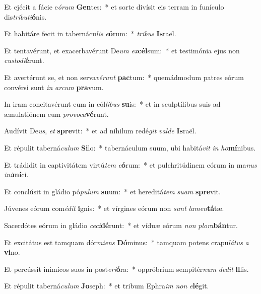 \item Et ejécit a fácie e\textit{ó}\textit{rum} \textbf{Gen}tes:~* et sorte divísit eis terram in funículo dis\textit{tri}\textit{bu}\textit{ti}\textbf{ó}nis.
\item Et habitáre fecit in tabernácu\textit{lis} \textit{e}\textbf{ó}rum:~* \textit{tri}\textit{bus} \textbf{Is}raël.
\item Et tentavérunt, et exacerbavérunt De\textit{um} \textit{ex}\textbf{cél}sum:~* et testimónia ejus non \textit{cus}\textit{to}\textit{di}\textbf{é}runt.
\item Et avertérunt se, et non serva\textit{vé}\textit{runt} \textbf{pac}tum:~* quemádmodum patres eórum convérsi sunt \textit{in} \textit{ar}\textit{cum} \textbf{pra}vum.
\item In iram concitavérunt eum in cól\textit{li}\textit{bus} \textbf{su}is:~* et in sculptílibus suis ad æmulatiónem eum \textit{pro}\textit{vo}\textit{ca}\textbf{vé}runt.
\item Audívit De\textit{us}, \textit{et} \textbf{spre}vit:~* et ad níhilum redé\textit{git} \textit{val}\textit{de} \textbf{Is}raël.
\item Et répulit taberná\textit{cu}\textit{lum} \textbf{Si}lo:~* tabernáculum suum, ubi habitá\textit{vit} \textit{in} \textit{ho}\textbf{mí}nibus.
\item Et trádidit in captivitátem virtú\textit{tem} \textit{e}\textbf{ó}rum:~* et pulchritúdinem eórum in ma\textit{nus} \textit{in}\textit{i}\textbf{mí}ci.
\item Et conclúsit in gládio pó\textit{pu}\textit{lum} \textbf{su}um:~* et hereditá\textit{tem} \textit{su}\textit{am} \textbf{spre}vit.
\item Júvenes eórum com\textit{é}\textit{dit} \textbf{i}gnis:~* et vírgines eórum non \textit{sunt} \textit{la}\textit{men}\textbf{tá}tæ.
\item Sacerdótes eórum in gládio \textit{ce}\textit{ci}\textbf{dé}runt:~* et víduæ eórum \textit{non} \textit{plo}\textit{ra}\textbf{bán}tur.
\item Et excitátus est tamquam dór\textit{mi}\textit{ens} \textbf{Dó}minus:~* tamquam potens crapu\textit{lá}\textit{tus} \textit{a} \textbf{vi}no.
\item Et percússit inimícos suos in post\textit{e}\textit{ri}\textbf{ó}ra:~* oppróbrium sempitér\textit{num} \textit{de}\textit{dit} \textbf{il}lis.
\item Et répulit taberná\textit{cu}\textit{lum} \textbf{Jo}seph:~* et tribum Ephra\textit{im} \textit{non} \textit{e}\textbf{lé}git.
